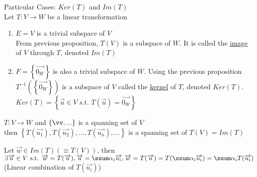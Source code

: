 \documentclass[12pt]{article}
\renewcommand{\v}[1]{\overrightarrow{#1}}
\newenvironment{proof}{\block[Proof]}{\endblock}
\newenvironment{remark}{\block[Remark]}{\endblock}
\newcommand{\st}[0]{\text{ s.t. }}
\newcommand{\bb}[1]{\left\{#1\right\}}
\newcommand{\pp}[1]{\left(#1\right)}
\begin{document}
	Particular Cases: $Ker(T)$ and $Im(T)$ \\
	Let $T: V \rightarrow W$ be a linear transformation \\
	\begin{enumerate}
		\item $E = V$ is a trivial subspace of $V$ \\
		From previous proposition, $T(V)$ is a subspace of $W$. It is called the \underline{image} of $V$ through $T$, denoted $Im(T)$ 
		
		\item $F = \bb{\v{0_W}}$ is also a trivial subspace of $W$. Using the previous proposition $T^{-1}\pp{\bb{\v{0_W}}}$ is a subspace of $V$ called the \underline{kernel} of $T$, denoted $Ker(T)$. \\
		$Ker(T) = \bb{\v{u} \in V \st T(\v{u}) = \v{0_W}}$
	\end{enumerate}
	
	\begin{remark}
		$T: V \rightarrow W$ and $\bb{\vv, ...}$ is a spanning set of $V$ \\
		then $\bb{T(\v{u_1}), T(\v{u_2}), ..., T(\v{u_n}), ...}$ is a spanning set of $T(V) = Im(T)$
		
		\begin{proof}
			Let $\v{w} \in Im(T) \pp{\equiv T(V)}$, then $\exists \v{u} \in V \st \v{w} = T(\v{u}), \v{u} = \ssum \alpha_i \v{u_i}, \v{w} = T(\v{u}) = T(\ssum \alpha_i \v{u_i}) = \ssum \alpha_i T(\v{u_i})$ (Linear combination of $T(\v{u_i})$)
		\end{proof}
	\end{remark}
	
\end{document}
